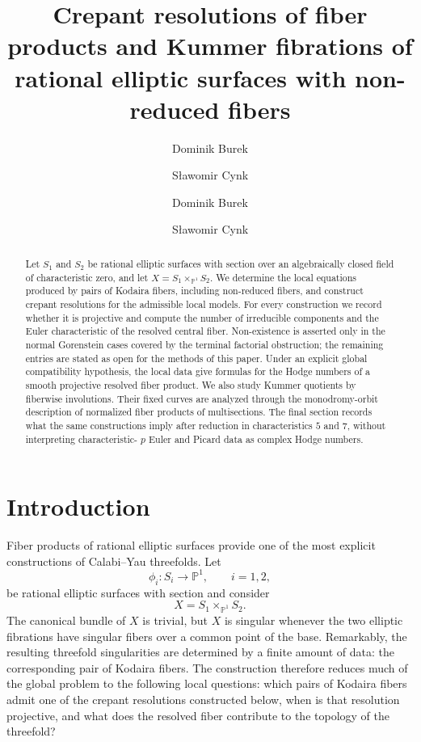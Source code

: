 \documentclass[a4paper]{amsart}
\author[D.\ Burek]{Dominik Burek}
\author[S.\ Cynk]{Sławomir Cynk}
\makeatletter
\theoremstyle{plain}
\theoremstyle{definition}
\theoremstyle{remark}
\numberwithin{equation}{section}
\newcommand{\myData}[1][]{
\author[D.\ Burek]{Dominik Burek}
\address{D.\ Burek{}\\{}%
Faculty of Mathematics and Computer Science\\{}Jagiellonian University,
\L{}ojasiewicza 6\\{}30-348 Krak\'{o}w\\{}Poland}
\email{dominik.burek@uj.edu.pl}
}
\newcommand{\bossData}[1][]{
\author[S.\ Cynk]{Sławomir Cynk}
\address{S.\ Cynk{}\\{}%
Faculty of Mathematics and Computer Science\\{}Jagiellonian University,
\L{}ojasiewicza 6\\{}30-348 Krak\'{o}w\\{}Poland}
\email{slawomir.cynk@uj.edu.pl}
}
\newcommand{\PP}{\mathbb{P}}
\makeatother
\begin{document}
\raggedbottom
\title[Crepant resolutions of elliptic fiber products]{Crepant resolutions of fiber products and Kummer fibrations of rational elliptic surfaces with non-reduced fibers}
\myData
\bossData

\begin{abstract}
Let \(S_1\) and \(S_2\) be rational elliptic surfaces with section over an
algebraically closed field of characteristic zero, and let
\(X=S_1\times_{\PP^1}S_2\).  We determine the local equations produced by
pairs of Kodaira fibers, including non-reduced fibers, and construct crepant
resolutions for the admissible local models.  For every construction we
record whether it is projective and compute the number of irreducible
components and the Euler characteristic of the resolved central fiber.
Non-existence is asserted only in the normal Gorenstein cases covered by the
terminal factorial obstruction; the remaining entries are stated as open
for the methods of this paper.  Under an explicit global compatibility
hypothesis, the local data give formulas for the Hodge numbers of a smooth
projective resolved fiber product.  We also study Kummer quotients by
fiberwise involutions.  Their fixed curves are analyzed through the
monodromy-orbit description of normalized fiber products of multisections.
The final section records what the same constructions imply after reduction
in characteristics \(5\) and \(7\), without interpreting characteristic-
\(p\) Euler and Picard data as complex Hodge numbers.
\end{abstract}

	\maketitle

\section{Introduction}

Fiber products of rational elliptic surfaces provide one of the most
explicit constructions of Calabi--Yau threefolds.  Let
\[
\phi_i\colon S_i\longrightarrow \PP^1,\qquad i=1,2,
\]
be rational elliptic surfaces with section and consider
\[
X=S_1\times_{\PP^1}S_2 .
\]
The canonical bundle of \(X\) is trivial, but \(X\) is singular whenever the
two elliptic fibrations have singular fibers over a common point of the
base.  Remarkably, the resulting threefold singularities are determined by
a finite amount of data: the corresponding pair of Kodaira fibers.  The
construction therefore reduces much of the global problem to the following
local questions: which pairs of Kodaira fibers admit one of the crepant
resolutions constructed below, when is that resolution projective, and what
does the resolved fiber contribute to the topology of the threefold?
\end{document}
